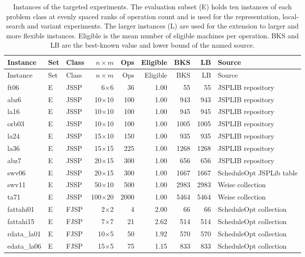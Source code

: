 {\footnotesize\setlength{\tabcolsep}{4pt}
\begin{longtable}{lllrrrrrl}
\caption{Instances of the targeted experiments. The evaluation subset (E) holds ten instances of each problem class at evenly spaced ranks of operation count and is used for the representation, local-search and variant experiments. The larger instances (L) are used for the extension to larger and more flexible instances. Eligible is the mean number of eligible machines per operation. BKS and LB are the best-known value and lower bound of the named source.}\label{tab:rev-instances}\\
\toprule
Instance & Set & Class & $n\times m$ & Ops & Eligible & BKS & LB & Source \\
\midrule
\endfirsthead
\toprule
Instance & Set & Class & $n\times m$ & Ops & Eligible & BKS & LB & Source \\
\midrule
\endhead
\bottomrule
\endfoot
ft06 & E & JSSP & 6$\times$6 & 36 & 1.00 & 55 & 55 & JSPLIB repository \\
abz6 & E & JSSP & 10$\times$10 & 100 & 1.00 & 943 & 943 & JSPLIB repository \\
la16 & E & JSSP & 10$\times$10 & 100 & 1.00 & 945 & 945 & JSPLIB repository \\
orb03 & E & JSSP & 10$\times$10 & 100 & 1.00 & 1005 & 1005 & JSPLIB repository \\
la24 & E & JSSP & 15$\times$10 & 150 & 1.00 & 935 & 935 & JSPLIB repository \\
la36 & E & JSSP & 15$\times$15 & 225 & 1.00 & 1268 & 1268 & JSPLIB repository \\
abz7 & E & JSSP & 20$\times$15 & 300 & 1.00 & 656 & 656 & JSPLIB repository \\
swv06 & E & JSSP & 20$\times$15 & 300 & 1.00 & 1667 & 1667 & ScheduleOpt JSPLib table \\
swv11 & E & JSSP & 50$\times$10 & 500 & 1.00 & 2983 & 2983 & Weise collection \\
ta71 & E & JSSP & 100$\times$20 & 2000 & 1.00 & 5464 & 5464 & Weise collection \\
fattahi01 & E & FJSP & 2$\times$2 & 4 & 2.00 & 66 & 66 & ScheduleOpt collection \\
fattahi15 & E & FJSP & 7$\times$7 & 21 & 2.62 & 514 & 514 & ScheduleOpt collection \\
rdata\_la01 & E & FJSP & 10$\times$5 & 50 & 1.92 & 570 & 570 & ScheduleOpt collection \\
edata\_la06 & E & FJSP & 15$\times$5 & 75 & 1.15 & 833 & 833 & ScheduleOpt collection \\

\end{longtable}}
